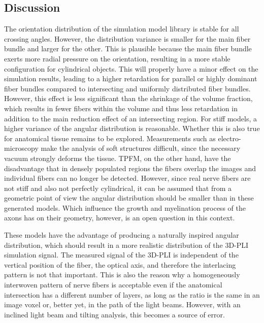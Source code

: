 \subsection{Discussion}
% 
The orientation distribution of the simulation model library is stable for all crossing angles.
However, the distribution variance is smaller for the main fiber bundle and larger for the other.
This is plausible because the main fiber bundle exerts more radial pressure on the orientation, resulting in a more stable configuration for cylindrical objects.
This will properly have a minor effect on the simulation results, leading to a higher retardation for parallel or highly dominant fiber bundles compared to intersecting and uniformly distributed fiber bundles.
However, this effect is less significant than the shrinkage of the volume fraction, which results in fewer fibers within the volume and thus less retardation in addition to the main reduction effect of an intersecting region.
For stiff models, a higher variance of the angular distribution is reasonable.
Whether this is also true for anatomical tissue remains to be explored.
Measurements such as electro-microscopy make the analysis of soft structures difficult, since the\textbf{} necessary vacuum strongly deforms the tissue.
\ac{TPFM}, on the other hand, have the disadvantage that in densely populated regions the fibers overlap the images and individual fibers can no longer be detected.
However, since real nerve fibers are not stiff and also not perfectly cylindrical, it can be assumed that from a geometric point of view the angular distribution should be smaller than in these generated models.
Which influence the growth and myelination process of the axons has on their geometry, however, is an open question in this context.
\par
%
These models have the advantage of producing a naturally inspired angular distribution, which should result in a more realistic distribution of the \ac{3D-PLI} simulation signal.
The measured signal of the \ac{3D-PLI} is independent of the vertical position of the fiber, the optical axis, and therefore the interlacing pattern is not that important.
This is also the reason why a homogeneously interwoven pattern of nerve fibers is acceptable even if the anatomical intersection has a different number of layers, as long as the ratio is the same in an image voxel or, better yet, in the path of the light beams.
However, with an inclined light beam and tilting analysis, this becomes a source of error.